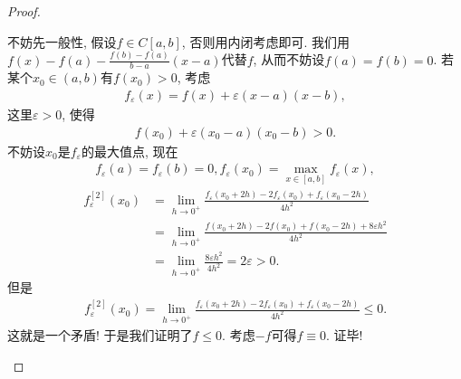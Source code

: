 \documentclass[../../main.tex]{subfiles}
\begin{document}
\begin{proof}
\begin{enumerate}
不妨先一般性, 假设$f \in C[a,b]$, 否则用内闭考虑即可. 
我们用$f(x) - f(a) - \frac{f(b) - f(a)}{b - a}(x - a)$代替$f$, 从而不妨设$f(a) = f(b) = 0$. 若某个$x_0 \in (a,b)$有$f(x_0) > 0$, 考虑
\begin{align*}
f_\varepsilon(x) = f(x) + \varepsilon(x - a)(x - b),
\end{align*}
这里$\varepsilon > 0$, 使得
\begin{align*}
f(x_0) + \varepsilon(x_0 - a)(x_0 - b) > 0.
\end{align*}
不妨设$x_0$是$f_\varepsilon$的最大值点, 现在
\begin{gather*}
f_\varepsilon(a) = f_\varepsilon(b) = 0, f_\varepsilon(x_0) = \max_{x \in [a,b]} f_\varepsilon(x),
\end{gather*}
\begin{align*}
f_{\varepsilon}^{[2]}(x_0)&=\lim_{h\rightarrow 0^+} \frac{f_{\varepsilon}(x_0+2h)-2f_{\varepsilon}(x_0)+f_{\varepsilon}(x_0-2h)}{4h^2}
\\
&=\lim_{h\rightarrow 0^+} \frac{f(x_0+2h)-2f(x_0)+f(x_0-2h)+8\varepsilon h^2}{4h^2}
\\
&=\lim_{h\rightarrow 0^+} \frac{8\varepsilon h^2}{4h^2}=2\varepsilon >0.
\end{align*}
但是
\begin{align*}
f_\varepsilon^{[2]}(x_0) = \lim_{h \to 0^+} \frac{f_\varepsilon(x_0 + 2h) - 2f_\varepsilon(x_0) + f_\varepsilon(x_0 - 2h)}{4h^2} \leqslant 0.
\end{align*}
这就是一个矛盾! 于是我们证明了$f \leqslant 0$. 考虑$-f$可得$f \equiv 0$. 证毕!
\end{enumerate}

\end{proof}
\end{document}
